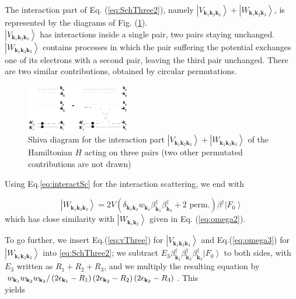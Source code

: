 \documentclass[epj]{svjour}
\begin{document}
The interaction part of Eq. (\ref{eq:SchThree2}), namely $\left|V_{\mathbf{k} _1\mathbf{k} _2%
\mathbf{k} _3}\right>+\left|W_{\mathbf{k} _1\mathbf{k} _2\mathbf{k} _3}\right> $, is represented by the diagrams of Fig. (\ref{fig:threeP}). \\$\left|V_{\mathbf{k} _1\mathbf{k} _2
\mathbf{k} _3}\right>$ has interactions inside a single pair, two pairs
staying unchanged. $\left|W_{\mathbf{k} _1\mathbf{k} _2\mathbf{k} _3}\right> $ contains processes in which the pair suffering the potential exchanges one of its electrons with a second pair, leaving the third pair unchanged.  There  are two similar  contributions, obtained by circular permutations.
\begin{figure}[htb]
   \includegraphics[width=0.4\textwidth]{threePair.eps}
\caption{Shiva diagram for the interaction part $\left|V_{\mathbf{k} _1\mathbf{k} _2
\mathbf{k} _3}\right> +\left|W_{\mathbf{k} _1\mathbf{k} _2
\mathbf{k} _3}\right>$ of the Hamiltonian $H$ acting on three pairs (two other permutated contributions are not drawn) }\label{fig:threeP}
 \end{figure}

Using Eq.\eqref{eq:interactSc} for the interaction scattering, we end with

\begin{equation}\label{eq:omega3}
\left|W_{\mathbf{k} _1\mathbf{k} _2\mathbf{k} _3}\right>= 2V(\delta_{\mathbf{k} _1\mathbf{k} _2}w_{\mathbf{k} _1}\beta^{\dagger}_{\mathbf{k} _1}\beta^{\dagger}_{\mathbf{k} _3}+ \text{2 perm.})\beta^{\dagger}\left|F_0\right>
\end{equation}
which has close similarity with  $\left|W_{\mathbf{k} _1\mathbf{k} _2}\right> $ given in Eq. (\ref{eq:omega2}). 



To go further, we insert Eq.(\ref{eq:vThree}) for $\left|V_{\mathbf{k} _1\mathbf{k} _2\mathbf{k} _3}\right>$  and Eq.(\ref{eq:omega3}) for $\left|W_{\mathbf{k} _1\mathbf{k} _2\mathbf{k} _3}\right> $ into \eqref{eq:SchThree2}; we subtract $E
_3\beta^{\dagger}_{\mathbf{k} _1}\beta^{\dagger}_{\mathbf{k}
_2}\beta^{\dagger}_{\mathbf{k} _3}\left|F_0\right>  $ to both sides, with $%
E _3$ written as $R_1+R_2+R_3$, and we multiply the resulting equation
by \\$w_{\mathbf{k} _1}w_{\mathbf{k} _2}w_{\mathbf{k} _3}/\left(2\epsilon_{%
\mathbf{k} _1}-R_1\right) \left(2\epsilon_{\mathbf{k} _2}-R_2\right)
\left(2\epsilon_{\mathbf{k} _3}-R_3\right) $. This \\yields
\end{document}
